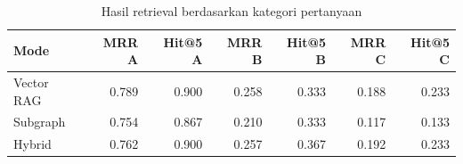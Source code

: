 \begin{table}[htbp]
    \centering
    \small
    \caption{Hasil retrieval berdasarkan kategori pertanyaan}
    \label{tab:bab4-retrieval-category}
    \begin{tabular}{lrrrrrr}
        \toprule
        Mode & MRR A & Hit@5 A & MRR B & Hit@5 B & MRR C & Hit@5 C \\
        \midrule
        Vector RAG & 0.789 & 0.900 & 0.258 & 0.333 & 0.188 & 0.233 \\
        Subgraph & 0.754 & 0.867 & 0.210 & 0.333 & 0.117 & 0.133 \\
        Hybrid & 0.762 & 0.900 & 0.257 & 0.367 & 0.192 & 0.233 \\
        \bottomrule
    \end{tabular}
\end{table}
